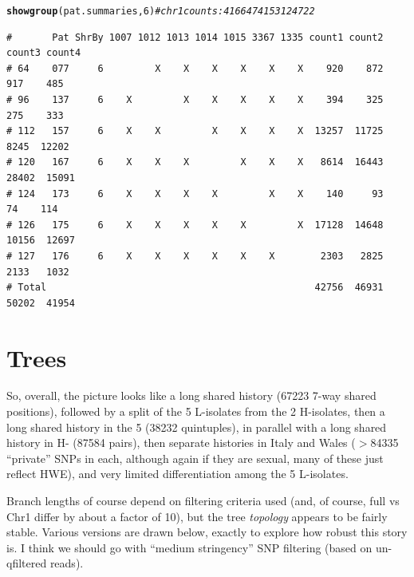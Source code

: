 \documentclass{article}\usepackage[]{graphicx}\usepackage[]{color}
\makeatletter
\newcommand{\hlnum}[1]{\textcolor[rgb]{0.686,0.059,0.569}{#1}}%
\newcommand{\hlcom}[1]{\textcolor[rgb]{0.678,0.584,0.686}{\textit{#1}}}%
\newcommand{\hlstd}[1]{\textcolor[rgb]{0.345,0.345,0.345}{#1}}%
\newcommand{\hlkwd}[1]{\textcolor[rgb]{0.737,0.353,0.396}{\textbf{#1}}}%
\newenvironment{kframe}{%
 \def\at@end@of@kframe{}%
 \ifinner\ifhmode%
  \def\at@end@of@kframe{\end{minipage}}%
  \begin{minipage}{\columnwidth}%
 \fi\fi%
 \def\FrameCommand##1{\hskip\@totalleftmargin \hskip-\fboxsep
 \colorbox{shadecolor}{##1}\hskip-\fboxsep
     \hskip-\linewidth \hskip-\@totalleftmargin \hskip\columnwidth}%
 \MakeFramed {\advance\hsize-\width
   \@totalleftmargin\z@ \linewidth\hsize
   \@setminipage}}%
 {\par\unskip\endMakeFramed%
 \at@end@of@kframe}
\newenvironment{knitrout}{}{} %
\makeatother
\begin{document}
\begin{knitrout}\footnotesize
{}\color{fgcolor}\begin{kframe}
\begin{alltt}
\hlkwd{showgroup}\hlstd{(pat.summaries,}\hlnum{6}\hlstd{)} \hlcom{# chr 1 counts:  4166   4741   5312  4722}
\end{alltt}
\begin{verbatim}
#       Pat ShrBy 1007 1012 1013 1014 1015 3367 1335 count1 count2 count3 count4
# 64    077     6         X    X    X    X    X    X    920    872    917    485
# 96    137     6    X         X    X    X    X    X    394    325    275    333
# 112   157     6    X    X         X    X    X    X  13257  11725   8245  12202
# 120   167     6    X    X    X         X    X    X   8614  16443  28402  15091
# 124   173     6    X    X    X    X         X    X    140     93     74    114
# 126   175     6    X    X    X    X    X         X  17128  14648  10156  12697
# 127   176     6    X    X    X    X    X    X        2303   2825   2133   1032
# Total                                               42756  46931  50202  41954
\end{verbatim}
\end{kframe}
\end{knitrout}

\section{Trees}
So, overall, the picture looks like a long shared history
  (67223 7-way shared positions),
followed by a split of the 5 L-isolates from the 2 H-isolates, then a long shared history in the 5
  (38232 quintuples),
in parallel with a long shared history in H-
  (87584 pairs),
then separate histories in Italy and Wales
  ($>$84335 
  ``private'' SNPs in each, although again if they are sexual, many of these just reflect HWE),
and very limited differentiation among the 5 L-isolates.  

Branch lengths of course depend on filtering criteria used (and, of course, full vs Chr1 differ by 
about a factor of 10), but the tree \emph{topology} appears to be fairly stable.  Various versions 
are drawn below, exactly to explore how robust this story is.  I think we should go with ``medium 
stringency'' SNP filtering (based on un-qfiltered reads).
\end{document}
